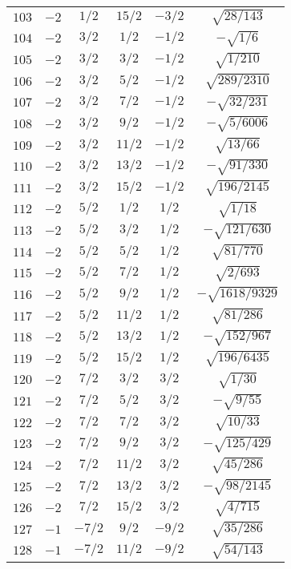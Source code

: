 \begin{table}
\begin{center}
\begin{tabular}{|c|c|c|c|c|c|}
$103$ & $-2$ & $1/2$ & $15/2$ & $-3/2$ & $\sqrt{28/143}$ \\ 
$104$ & $-2$ & $3/2$ & $1/2$ & $-1/2$ & $-\sqrt{1/6}$ \\ 
$105$ & $-2$ & $3/2$ & $3/2$ & $-1/2$ & $\sqrt{1/210}$ \\ 
$106$ & $-2$ & $3/2$ & $5/2$ & $-1/2$ & $\sqrt{289/2310}$ \\ 
$107$ & $-2$ & $3/2$ & $7/2$ & $-1/2$ & $-\sqrt{32/231}$ \\ 
$108$ & $-2$ & $3/2$ & $9/2$ & $-1/2$ & $-\sqrt{5/6006}$ \\ 
$109$ & $-2$ & $3/2$ & $11/2$ & $-1/2$ & $\sqrt{13/66}$ \\ 
$110$ & $-2$ & $3/2$ & $13/2$ & $-1/2$ & $-\sqrt{91/330}$ \\ 
$111$ & $-2$ & $3/2$ & $15/2$ & $-1/2$ & $\sqrt{196/2145}$ \\ 
$112$ & $-2$ & $5/2$ & $1/2$ & $1/2$ & $\sqrt{1/18}$ \\ 
$113$ & $-2$ & $5/2$ & $3/2$ & $1/2$ & $-\sqrt{121/630}$ \\ 
$114$ & $-2$ & $5/2$ & $5/2$ & $1/2$ & $\sqrt{81/770}$ \\ 
$115$ & $-2$ & $5/2$ & $7/2$ & $1/2$ & $\sqrt{2/693}$ \\ 
$116$ & $-2$ & $5/2$ & $9/2$ & $1/2$ & $-\sqrt{1618/9329}$ \\ 
$117$ & $-2$ & $5/2$ & $11/2$ & $1/2$ & $\sqrt{81/286}$ \\ 
$118$ & $-2$ & $5/2$ & $13/2$ & $1/2$ & $-\sqrt{152/967}$ \\ 
$119$ & $-2$ & $5/2$ & $15/2$ & $1/2$ & $\sqrt{196/6435}$ \\ 
$120$ & $-2$ & $7/2$ & $3/2$ & $3/2$ & $\sqrt{1/30}$ \\ 
$121$ & $-2$ & $7/2$ & $5/2$ & $3/2$ & $-\sqrt{9/55}$ \\ 
$122$ & $-2$ & $7/2$ & $7/2$ & $3/2$ & $\sqrt{10/33}$ \\ 
$123$ & $-2$ & $7/2$ & $9/2$ & $3/2$ & $-\sqrt{125/429}$ \\ 
$124$ & $-2$ & $7/2$ & $11/2$ & $3/2$ & $\sqrt{45/286}$ \\ 
$125$ & $-2$ & $7/2$ & $13/2$ & $3/2$ & $-\sqrt{98/2145}$ \\ 
$126$ & $-2$ & $7/2$ & $15/2$ & $3/2$ & $\sqrt{4/715}$ \\ 
$127$ & $-1$ & $-7/2$ & $9/2$ & $-9/2$ & $\sqrt{35/286}$ \\ 
$128$ & $-1$ & $-7/2$ & $11/2$ & $-9/2$ & $\sqrt{54/143}$ \\ 

\end{tabular}
\end{center}
\end{table}

